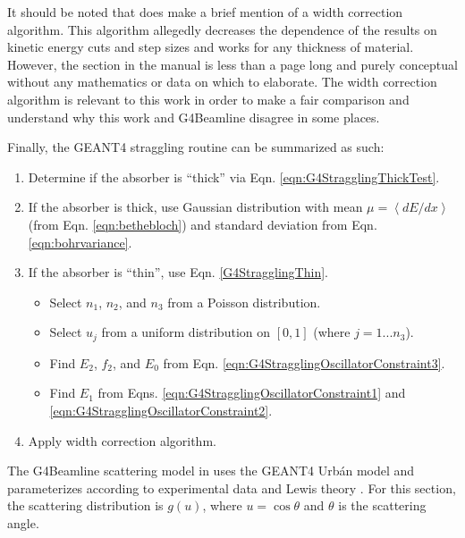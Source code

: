 It should be noted that \cite{geant4} does make a brief mention of a width correction algorithm. This algorithm allegedly decreases the dependence of the results on kinetic energy cuts and step sizes and works for any thickness of material. However, the section in the manual is less than a page long and purely conceptual without any mathematics or data on which to elaborate. The width correction algorithm is relevant to this work in order to make a fair comparison and understand why this work and G4Beamline disagree in some places.

Finally, the GEANT4 straggling routine can be summarized as such:
\begin{enumerate}
\item{Determine if the absorber is ``thick'' via Eqn. \ref{eqn:G4StragglingThickTest}.}
\item{If the absorber is thick, use Gaussian distribution with mean $\mu = \left<dE/dx\right>$ (from Eqn. \ref{eqn:bethebloch}) and standard deviation from Eqn. \ref{eqn:bohrvariance}.}
\item{If the absorber is ``thin'', use Eqn. \ref{G4StragglingThin}.
	\begin{itemize}
	\item{Select $n_1$, $n_2$, and $n_3$ from a Poisson distribution.}
	\item{Select $u_j$ from a uniform distribution on $[0,1]$ (where $j=1...n_3$).}
	\item{Find $E_2$, $f_2$, and $E_0$ from Eqn. \ref{eqn:G4StragglingOscillatorConstraint3}.} 
	\item{Find $E_1$ from Eqns. \ref{eqn:G4StragglingOscillatorConstraint1} and \ref{eqn:G4StragglingOscillatorConstraint2}.}
	\end{itemize}
	}
\item{Apply width correction algorithm.}
\end{enumerate}
 \label{sec:g4blscattering}\par
The G4Beamline scattering model in \cite{g4bl} uses the GEANT4 Urb\'{a}n model \cite{geant4} and parameterizes according to experimental data and Lewis theory \cite{lewis}. For this section, the scattering distribution is $g(u)$, where $u=\cos\theta$ and $\theta$ is the scattering angle.

